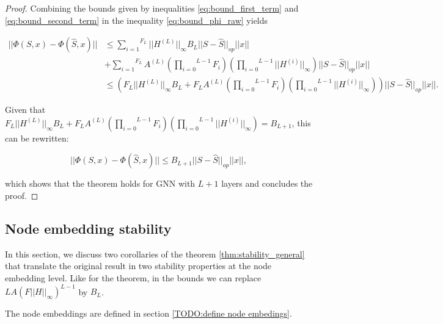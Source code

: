 \documentclass[11pt,a4paper]{article}
\newcommand{\op}[1]{|| #1 ||_{op}}
\newcommand{\ninf}[1]{|| #1 ||_\infty}
\newcommand{\Sum}[2]{\overset{#2}{\underset{#1}{\sum}}}
\newcommand{\Prod}[2]{\overset{#2}{\underset{#1}{\prod}}}
\theoremstyle{definition}
\renewcommand{\leq}{\leqslant}
\begin{document}
\begin{proof}
            Combining the bounds given by inequalities \ref{eq:bound_first_term} and \ref{eq:bound_second_term} in the inequality \ref{eq:bound_phi_raw} yields

            \begin{align}
                || \Phi (S,x) - \Phi (\hat{S},x) || &\leq \Sum{i=1}{F_L}  \ninf{H^{(L)}} B_L \op{S - \hat{S}} ||x|| \nonumber \\
                &+ \Sum{i=1}{F_L} A^{(L)} \left( \Prod{i=0}{L-1} F_i \right) \left( \Prod{i=0}{L-1} \ninf{H^{(i)}} \right) \op{S-\hat{S}} ||x|| \\
                & \leq \left( F_L \ninf{H^{(L)}} B_L + F_L A^{(L)} \left( \Prod{i=0}{L-1} F_i \right) \left( \Prod{i=0}{L-1} \ninf{H^{(i)}} \right) \right) \op{S-\hat{S}} ||x||.
            \end{align}

            Given that $F_L \ninf{H^{(L)}} B_L + F_L A^{(L)} \left( \Prod{i=0}{L-1} F_i \right) \left( \Prod{i=0}{L-1} \ninf{H^{(i)}} \right) = B_{L+1}$, this can be rewritten:

            \begin{equation}
                || \Phi (S,x) - \Phi (\hat{S},x) || \leq B_{L+1} \op{S - \hat{S}} ||x||,
            \end{equation}

            which shows that the theorem holds for GNN with $L+1$ layers and concludes the proof.

        \end{proof}



   \subsection{Node embedding stability}

    In this section, we discuss two corollaries of the theorem \ref{thm:stability_general} that translate the original result in two stability properties at the node embedding level. Like for the theorem, in the bounds we can replace $L A (F \ninf{H})^{L-1} $ by $B_L$. 
    
    The node embeddings are defined in section \ref{TODO:define node embedings}.
\end{document}
